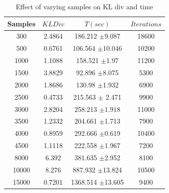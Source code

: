 \documentclass{sig-alternate}
\begin{document}

\begin{table}[htdp]
\begin{center}
\begin{tabular}{| c | c | c | c |}
\hline
Samples & $KL Div$ & $T(sec)$ & $Iterations$ \\
\hline
300 & 2.4864 & 186.212 $\pm$9.087 & 18600 \\
500 & 0.6761 & 106.564 $\pm$10.046 & 10200 \\
1000 & 1.1088 & 158.521 $\pm$1.97  & 11200 \\
1500 & 3.8829 & 92.896 $\pm$8.075  & 5300 \\
2000 & 1.8686 & 130.98 $\pm$1.932 & 6900 \\
2500 & 0.4733 & 215.563 $\pm$ 2.471 & 9900 \\
3000 & 2.8204 & 258.213 $\pm1.918$ & 11000 \\
3500 & 1.2332 & 204.661 $\pm$1.713 & 7900 \\
4000 & 0.8959 & 292.666 $\pm$0.619 & 10400  \\
4500 & 1.1118 & 222.558 $\pm$1.967 & 7200  \\
8000 & 6.392 & 381.635 $\pm$2.952 & 8100  \\
10000 & 8.276 & 887.932 $\pm$13.824 & 10500  \\
15000 & 0.7201 & 1368.514 $\pm$13.605 & 9400  \\
\hline
\end{tabular}
\end{center}
\caption{Effect of varying samples on KL div and time}
\label{table:sample1}
\end{table}
\end{document}
